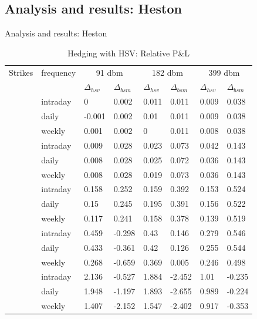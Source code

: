 \documentclass{beamer}
\begin{document}
\subsection{Analysis and results: Heston}
\begin{frame}{Analysis and results: Heston}

\begin{table}[ht]
\small
\centering
\begin{tabular}{llllllll}
  \hline
  \hline
Strikes & frequency  &\multicolumn{2}{c}{91 dbm} & \multicolumn{2}{c}{182 dbm} & \multicolumn{2}{c}{399 dbm} \\ 
   &  & $\Delta_{hsv}$ & $\Delta_{bsm}$ & $\Delta_{hsv}$ & $\Delta_{bsm}$ & $\Delta_{hsv}$ & $\Delta_{bsm}$ \\ 
   \hdashline
  \multirow{3}{*}{140} & intraday & 0 & 0.002 & 0.011 & 0.011 & 0.009 & 0.038 \\ 
  & daily & -0.001 & 0.002 & 0.01 & 0.011 & 0.009 & 0.038 \\ 
  & weekly & 0.001 & 0.002 & 0 & 0.011 & 0.008 & 0.038 \\ 
  \hdashline
  \multirow{3}{*}{160} & intraday & 0.009 & 0.028 & 0.023 & 0.073 & 0.042 & 0.143 \\ 
  & daily & 0.008 & 0.028 & 0.025 & 0.072 & 0.036 & 0.143 \\ 
  & weekly & 0.008 & 0.028 & 0.019 & 0.073 & 0.036 & 0.143 \\ 
  \hdashline
  \multirow{3}{*}{186} & intraday & 0.158 & 0.252 & 0.159 & 0.392 & 0.153 & 0.524 \\ 
  & daily & 0.15 & 0.245 & 0.195 & 0.391 & 0.156 & 0.522 \\ 
  & weekly & 0.117 & 0.241 & 0.158 & 0.378 & 0.139 & 0.519 \\ 
  \hdashline 
  \multirow{3}{*}{200} & intraday & 0.459 & -0.298 & 0.43 & 0.146 & 0.279 & 0.546 \\ 
  & daily & 0.433 & -0.361 & 0.42 & 0.126 & 0.255 & 0.544 \\ 
  & weekly & 0.268 & -0.659 & 0.369 & 0.005 & 0.246 & 0.498 \\ 
  \hdashline 
  \multirow{3}{*}{230} & intraday & 2.136 & -0.527 & 1.884 & -2.452 & 1.01 & -0.235 \\ 
  & daily & 1.948 & -1.197 & 1.893 & -2.655 & 0.989 & -0.224 \\ 
  & weekly & 1.407 & -2.152 & 1.547 & -2.402 & 0.917 & -0.353 \\ 
   \hline
\end{tabular}
\caption{Hedging with HSV: Relative P\&L} 
\label{t:analysis:heston:pl}
\end{table}
 
\end{frame}




 
\end{document}
